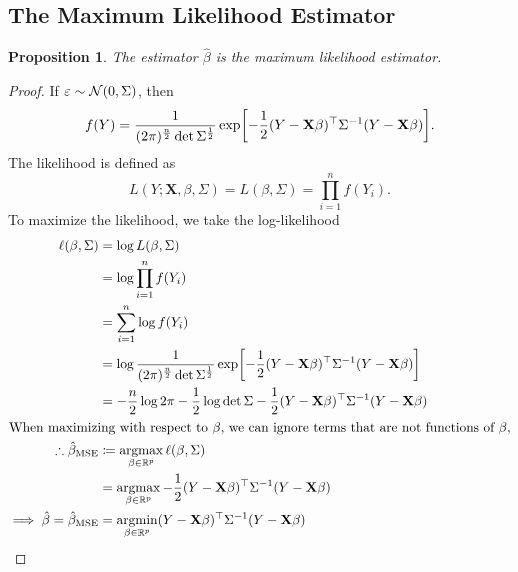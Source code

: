 \documentclass[letterpaper, reqno]{amsart}
\newtheorem{prop}{Proposition}[section]
\numberwithin{equation}{section}
\newcommand{\T}{\top} %
\newcommand{\vect}[1]{\boldsymbol{\mathbf{#1}}} %
\newcommand{\R}{\mathbb{R}}  %
\newcommand{\N}[2]{\mathcal{N}\mleft( #1, #2 \mright)}
\newcommand{\sumi}[2]{\sum_{#1=1}^{#2}}
\newcommand{\Xm}{\vect{X}}
\newcommand{\Bv}{\beta}
\newcommand{\Bvh}{\hat{\beta}}
\newcommand{\ve}{\varepsilon}
\DeclareMathOperator*{\argmin}{argmin}
\DeclareMathOperator*{\argmax}{argmax}
\begin{document}
\subsection{The Maximum Likelihood Estimator}
\begin{prop}
  The estimator $\Bvh$ is the maximum likelihood estimator.
\end{prop}

\begin{proof}
  If $\ve \sim \N{0}{\Sigma}$, then
  \[ f(Y) = \frac{1}{(2\pi)^\frac{n}{2} \det \Sigma^{\frac{1}{2}}}
      \exp \mleft[-\frac{1}{2} (Y - \Xm\Bv)^\T \Sigma^{-1} (Y - \Xm\Bv) \mright]. \]
  The likelihood is defined as
  \[ L(Y; \Xm, \Bv, \Sigma) = L(\Bv, \Sigma) =  \prod_{i=1}^n f(Y_i). \]
  To maximize the likelihood, we take the log-likelihood
  \begin{align*}
    \ell(\Bv, \Sigma) &= \log L(\Bv, \Sigma) \\
    &= \log \prod_{i=1}^n f(Y_i) \\
    &= \sumi{i}{n} \log f(Y_i) \\
    &= \log \frac{1}{(2\pi)^\frac{n}{2} \det \Sigma^{\frac{1}{2}}}
      \exp \mleft[-\frac{1}{2} (Y - \Xm\Bv)^\T \Sigma^{-1} (Y - \Xm\Bv) \mright] \\
    &= -\frac{n}{2} \log 2\pi - \frac{1}{2} \log \det \Sigma 
        - \frac{1}{2} (Y - \Xm\Bv)^\T \Sigma^{-1} (Y - \Xm\Bv) \\
    \intertext{When maximizing with respect to $\Bv$, we can ignore terms
      that are not functions of $\Bv$,}
    \therefore \Bvh_\mathrm{MSE} &\coloneqq \argmax_{\Bv \in \R^p} \ell(\Bv, \Sigma) \\
    &= \argmax_{\Bv \in \R^p} - \frac{1}{2} (Y - \Xm\Bv)^\T \Sigma^{-1} (Y - \Xm\Bv) \\
    \implies \Bvh = \Bvh_\mathrm{MSE} &= \argmin_{\Bv \in \R^p} (Y - \Xm\Bv)^\T \Sigma^{-1} (Y - \Xm\Bv)   \qedhere
  \end{align*}
\end{proof}
\end{document}
